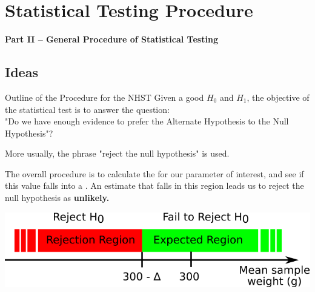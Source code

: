 \section{Statistical Testing Procedure}

\begin{frame}
  \begin{center}
    {\bf Part II -- General Procedure of Statistical Testing}
  \end{center}
\end{frame}

\subsection{Ideas}
\begin{frame}{Outline of the Procedure for the NHST}
  Given a good $H_0$ and $H_1$, the objective of the statistical test is to answer the question:\\
  "Do we have enough evidence to prefer the Alternate Hypothesis to the Null Hypothesis"?\bigskip

  More usually, the phrase "reject the null hypothesis" is used.\bigskip

  The overall procedure is to calculate the  for our parameter of interest, and see if this value falls into a . An estimate that falls in this region leads us to reject the null hypothesis as {\bf unlikely.}

  \begin{center}
    \includegraphics[width=.8\textwidth]{../img/critical_region}
  \end{center}
\end{frame}

